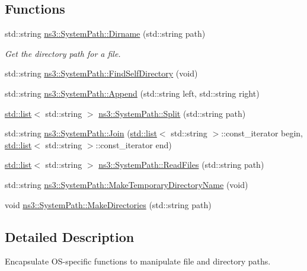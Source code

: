 \subsection*{Functions}
\begin{DoxyCompactItemize}
\item 
std\+::string \hyperlink{group__systempath_ga657599fb7660fc6ebe4b6aaea0021176}{ns3\+::\+System\+Path\+::\+Dirname} (std\+::string path)
\begin{DoxyCompactList}\small\item\em Get the directory path for a file. \end{DoxyCompactList}\item 
std\+::string \hyperlink{group__systempath_gad52e6f153465b40487da3a2a9ee5f5d6}{ns3\+::\+System\+Path\+::\+Find\+Self\+Directory} (void)
\item 
std\+::string \hyperlink{group__systempath_gaaa5a530cee42c8eda7e4f4523ef7e1cd}{ns3\+::\+System\+Path\+::\+Append} (std\+::string left, std\+::string right)
\item 
\hyperlink{openflow-interface_8h_afd9bcfa176617760671b67580f536fa7}{std\+::list}$<$ std\+::string $>$ \hyperlink{group__systempath_ga523072e05da63b63113d1bea840edf1a}{ns3\+::\+System\+Path\+::\+Split} (std\+::string path)
\item 
std\+::string \hyperlink{group__systempath_gab3212957e6b4f873ece3c6b8ed746d72}{ns3\+::\+System\+Path\+::\+Join} (\hyperlink{openflow-interface_8h_afd9bcfa176617760671b67580f536fa7}{std\+::list}$<$ std\+::string $>$\+::const\+\_\+iterator begin, \hyperlink{openflow-interface_8h_afd9bcfa176617760671b67580f536fa7}{std\+::list}$<$ std\+::string $>$\+::const\+\_\+iterator end)
\item 
\hyperlink{openflow-interface_8h_afd9bcfa176617760671b67580f536fa7}{std\+::list}$<$ std\+::string $>$ \hyperlink{group__systempath_ga152a348bccf02d8373607b0239587b87}{ns3\+::\+System\+Path\+::\+Read\+Files} (std\+::string path)
\item 
std\+::string \hyperlink{group__systempath_ga271d7de64c9f6454db57fe21bc51c5d0}{ns3\+::\+System\+Path\+::\+Make\+Temporary\+Directory\+Name} (void)
\item 
void \hyperlink{group__systempath_ga9529f7530ba5d513c8811acc15743d24}{ns3\+::\+System\+Path\+::\+Make\+Directories} (std\+::string path)
\end{DoxyCompactItemize}


\subsection{Detailed Description}
Encapsulate O\+S-\/specific functions to manipulate file and directory paths. 

